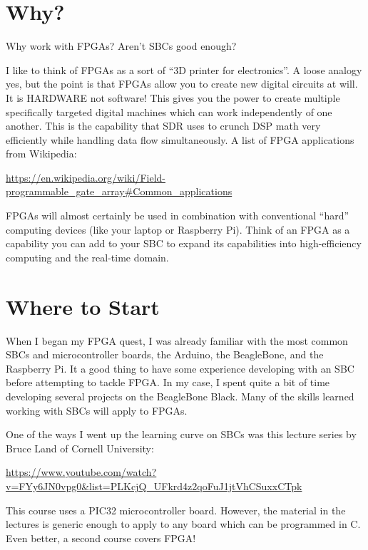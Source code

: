 \section{Why?}

Why work with FPGAs?  Aren't SBCs good enough?

I like to think of FPGAs as a sort of ``3D printer for electronics''.  A loose analogy yes, but the point is that FPGAs allow you to create new digital circuits at will.  It is HARDWARE not software!  This gives you the power to create multiple specifically targeted digital machines which can work independently of one another.  This is the capability that SDR uses to crunch DSP math very efficiently while handling data flow simultaneously.  A list of FPGA applications from Wikipedia:

\url{https://en.wikipedia.org/wiki/Field-programmable_gate_array#Common_applications}

FPGAs will almost certainly be used in combination with conventional ``hard'' computing devices (like your laptop or Raspberry Pi).  Think of an FPGA as a capability you can add to your SBC to expand its capabilities into high-efficiency computing and the real-time domain.

\section{Where to Start}

When I began my FPGA quest, I was already familiar with the most common SBCs and microcontroller boards, the Arduino, the BeagleBone, and the Raspberry Pi.
It a good thing to have some experience developing with an SBC before attempting to tackle FPGA.  In my case, I spent quite a bit of time developing several projects on the BeagleBone Black.  Many of the skills learned working with SBCs will apply to FPGAs.

One of the ways I went up the learning curve on SBCs was this lecture series by Bruce Land of Cornell University:

\begin{footnotesize}
\url{https://www.youtube.com/watch?v=FYy6JN0vpg0&list=PLKcjQ_UFkrd4z2qoFuJ1jtVhCSuxxCTpk}
\end{footnotesize}

This course uses a PIC32 microcontroller board.  However, the material in the lectures is generic enough to apply to any board which can be programmed in C.
Even better, a second course covers FPGA!

